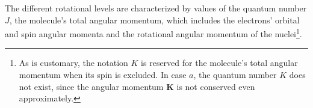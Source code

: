 The different rotational levels are characterized by values of the quantum number $J$, the molecule's total angular momentum, which includes the electrons' orbital and spin angular momenta and the rotational angular momentum of the nuclei\footnote{As is customary, the notation $K$ is reserved for the molecule's total angular momentum when its spin is excluded. In case $a$, the quantum number $K$ does not exist, since the angular momentum $\mathbf K$ is not conserved even approximately.}.
